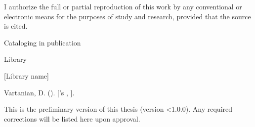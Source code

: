 

\imprimircapa


\imprimirfolhaderosto


\begin{fichacatalografica}
I authorize the full or partial reproduction of this work by any conventional or electronic means for the purposes of study and research, provided that the source is cited.
\ABNTEXfontereduzida

\vfill
\begin{center}
Cataloging in publication

Library

[Library name]

\medskip
\setlength{\fboxsep}{1cm}
\end{center}
\end{fichacatalografica}


\begin{errata}[\errataname]
\noindent Vartanian, D. ({\imprimirdata}). \textit{\imprimirtitulo} [{\imprimirtipodetituloacademico}'s {\imprimirtipotrabalho}, {\imprimiruniversidade}].
\tinyskip

This is the preliminary version of this thesis (version \textless1.0.0).
Any required corrections will be listed here upon approval.

\end{errata}

